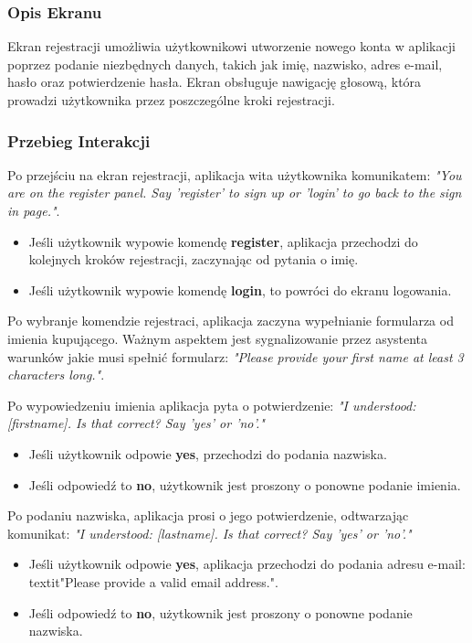\subsubsection{Opis Ekranu}

Ekran rejestracji umożliwia użytkownikowi utworzenie nowego konta w aplikacji poprzez podanie niezbędnych danych, takich jak imię, nazwisko, adres e-mail, hasło oraz potwierdzenie hasła. Ekran obsługuje nawigację głosową, która prowadzi użytkownika przez poszczególne kroki rejestracji.

\subsubsection{Przebieg Interakcji}

Po przejściu na ekran rejestracji, aplikacja wita użytkownika komunikatem: 
\textit{"You are on the register panel. Say 'register' to sign up or 'login' to go back to the sign in page."}.

\begin{itemize}
    \item Jeśli użytkownik wypowie komendę \textbf{register}, aplikacja przechodzi do kolejnych kroków rejestracji, zaczynając od pytania o imię.
    \item Jeśli użytkownik wypowie komendę \textbf{login}, to powróci do ekranu logowania.
\end{itemize}

Po wybranje komendzie rejestraci, aplikacja zaczyna wypełnianie formularza od imienia kupującego. Ważnym aspektem jest sygnalizowanie przez asystenta warunków jakie musi spełnić formularz: \textit{"Please provide your first name at least 3 characters long."}. 

Po wypowiedzeniu imienia aplikacja pyta o potwierdzenie:
\textit{"I understood: [firstname]. Is that correct? Say 'yes' or 'no'."}

\begin{itemize}
    \item Jeśli użytkownik odpowie \textbf{yes}, przechodzi do podania nazwiska.
    \item Jeśli odpowiedź to \textbf{no}, użytkownik jest proszony o ponowne podanie imienia.
\end{itemize}

Po podaniu nazwiska, aplikacja prosi o jego potwierdzenie, odtwarzając komunikat:
\textit{"I understood: [lastname]. Is that correct? Say 'yes' or 'no'."}

\begin{itemize}
    \item Jeśli użytkownik odpowie \textbf{yes}, aplikacja przechodzi do podania adresu e-mail: textit{"Please provide a valid email address."}.
    \item Jeśli odpowiedź to \textbf{no}, użytkownik jest proszony o ponowne podanie nazwiska.
\end{itemize}


